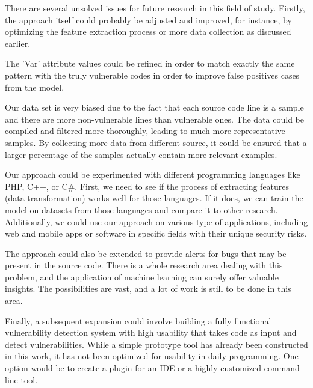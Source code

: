 There are several unsolved issues for future research in this field of study. Firstly, the approach itself could probably be adjusted and improved, for instance, by optimizing the feature extraction process or more data collection as discussed earlier. 

The 'Var' attribute values could be refined in order to match exactly the same pattern with the truly vulnerable codes in order to improve false positives cases from the model.

Our data set is very biased due to the fact that each source code line is a sample and there are more non-vulnerable lines than vulnerable ones. The data could be compiled and filtered more thoroughly, leading to much more representative samples. By collecting more data from different source, it could be ensured that a larger percentage of the samples actually contain more relevant examples.

Our approach could be experimented with different programming languages like PHP, C++, or C\#. First, we need to see if the process of extracting features (data transformation) works well for those languages. If it does, we can train the model on datasets from those languages and compare it to other research. Additionally, we could use our approach on various type of applications, including web and mobile apps or software in specific fields with their unique security risks.

The approach could also be extended to provide alerts for bugs that may be present in the source code. There is a whole research area dealing with this problem, and the application of machine learning can surely offer valuable insights. The possibilities are vast, and a lot of work is still to be done in this area.

Finally, a subsequent expansion could involve building a fully functional vulnerability detection system with high usability that takes code as input and detect vulnerabilities. While a simple prototype tool has already been constructed in this work, it has not been optimized for usability in daily programming. One option would be to create a plugin for an IDE or a highly customized command line tool.
